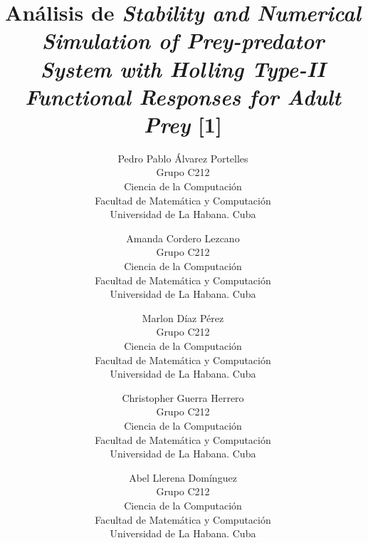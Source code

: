 \documentclass{wscpaperproc}
\theoremstyle{wsc}
\begin{document}
%
%

\title{Análisis de {\it Stability and Numerical Simulation of Prey-predator System with Holling
			Type-II Functional Responses for Adult Prey} [1]}

\author{
	Pedro Pablo Álvarez Portelles\\[12pt]
	Grupo C212\\
	Ciencia de la Computación\\
	Facultad de Matemática y Computación\\
	Universidad de La Habana. Cuba\\
	\and
	Amanda Cordero Lezcano\\[12pt]
	Grupo C212\\
	Ciencia de la Computación\\
	Facultad de Matemática y Computación\\
	Universidad de La Habana. Cuba\\
	\and
	Marlon Díaz Pérez\\[12pt]
	Grupo C212\\
	Ciencia de la Computación\\
	Facultad de Matemática y Computación\\
	Universidad de La Habana. Cuba\\
	\and
	Christopher Guerra Herrero\\[12pt]
	Grupo C212\\
	Ciencia de la Computación\\
	Facultad de Matemática y Computación\\
	Universidad de La Habana. Cuba\\
	\and
	Abel Llerena Domínguez\\[12pt]
	Grupo C212\\
	Ciencia de la Computación\\
	Facultad de Matemática y Computación\\
	Universidad de La Habana. Cuba\\
}
\end{document}
